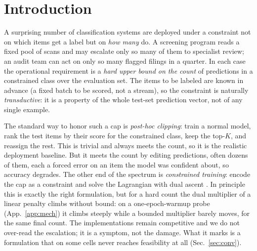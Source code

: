 \documentclass[10pt]{article}
\begin{document}
\section{Introduction}
\label{sec:intro}

A surprising number of classification systems are deployed under a constraint
not on which items get a label but on \emph{how many} do. A screening program
reads a fixed pool of scans and may escalate only so many of them to
specialist review; an audit team can act on only so many flagged filings in a
quarter. In each case the operational requirement is a
\emph{hard upper bound on the count} of predictions in a constrained class over
the evaluation set. The items to be labeled are known in advance (a fixed
batch to be scored, not a stream), so the constraint is naturally
\emph{transductive}: it is a property of the whole test-set prediction vector,
not of any single example.

The standard way to honor such a cap is \emph{post-hoc clipping}: train a normal
model, rank the test items by their score for the constrained class, keep the
top-$K$, and reassign the rest. This is trivial and always meets the count, so
it is the realistic deployment baseline. But it meets the count by editing
predictions, often dozens of them, each a forced error on an item the model was
confident about, so accuracy degrades. The other end of the spectrum is
\emph{constrained training}: encode the cap as a constraint and solve the
Lagrangian with dual ascent
\citep{fioretto2020lagrangian,hounie2023resilient,chamon2020probably}. In
principle this is exactly the right formulation, but for a hard count the dual
multiplier of a linear penalty climbs without bound: on a one-epoch-warmup
probe (App.~\ref{app:mech}) it climbs steeply while a bounded multiplier
barely moves, for the same final count. The implementations remain competitive
and we do not over-read the escalation; it is a symptom, not the damage. What
it marks is a formulation that on some cells never reaches feasibility at all
(Sec.~\ref{sec:conv}).
\end{document}
